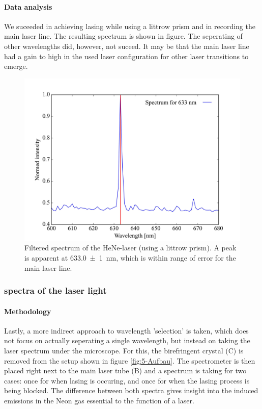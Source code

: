 \documentclass[../main.tex]{subfiles}
\begin{document}
    \paragraph{Data analysis}
        We suceeded in achieving lasing while using a littrow prism and in recording the main laser line. The resulting spectrum is shown in figure. The seperating of other wavelengths did, however, not suceed. It may be that the main laser line had a gain to high in the used laser configuration for other laser transitions to emerge.

        \begin{figure}[H]
            \centering 
            \includegraphics[width = 15cm]{Bilddateien/5/5-Spektrenlittrowprisma.jpg}
            \caption{Filtered spectrum of the HeNe-laser (using a littrow prism). A peak is apparent at \SI{633.0(10)}{\nm}, which is within range of error for the main laser line.}
            \label{fig:5-Spektrenlittrowprisma}
        \end{figure}

\subsubsection{spectra of the laser light}
    \paragraph{Methodology}
    Lastly, a more indirect approach to wavelength 'selection' is taken, which does not focus on actually seperating a single wavelength, but instead on taking the laser spectrum under the microscope. For this, the birefringent crystal (C) is removed from the setup shown in figure \ref{fig:5-Aufbau}. The spectrometer is then placed right next to the main laser tube (B) and a spectrum is taking for two cases: once for when lasing is occuring, and once for when the lasing process is being blocked. The difference between both spectra gives insight into the induced emissions in the Neon gas essential to the function of a laser.
\end{document}
